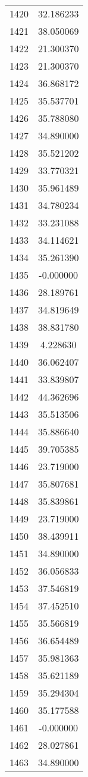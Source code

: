 \documentclass[12pt]{article}
\begin{document}
\begin{longtable}{@{}cc@{}}
1420 & 32.186233 \\
1421 & 38.050069 \\
1422 & 21.300370 \\
1423 & 21.300370 \\
1424 & 36.868172 \\
1425 & 35.537701 \\
1426 & 35.788080 \\
1427 & 34.890000 \\
1428 & 35.521202 \\
1429 & 33.770321 \\
1430 & 35.961489 \\
1431 & 34.780234 \\
1432 & 33.231088 \\
1433 & 34.114621 \\
1434 & 35.261390 \\
1435 & -0.000000 \\
1436 & 28.189761 \\
1437 & 34.819649 \\
1438 & 38.831780 \\
1439 & 4.228630 \\
1440 & 36.062407 \\
1441 & 33.839807 \\
1442 & 44.362696 \\
1443 & 35.513506 \\
1444 & 35.886640 \\
1445 & 39.705385 \\
1446 & 23.719000 \\
1447 & 35.807681 \\
1448 & 35.839861 \\
1449 & 23.719000 \\
1450 & 38.439911 \\
1451 & 34.890000 \\
1452 & 36.056833 \\
1453 & 37.546819 \\
1454 & 37.452510 \\
1455 & 35.566819 \\
1456 & 36.654489 \\
1457 & 35.981363 \\
1458 & 35.621189 \\
1459 & 35.294304 \\
1460 & 35.177588 \\
1461 & -0.000000 \\
1462 & 28.027861 \\
1463 & 34.890000 \\

\end{longtable}
\end{document}
